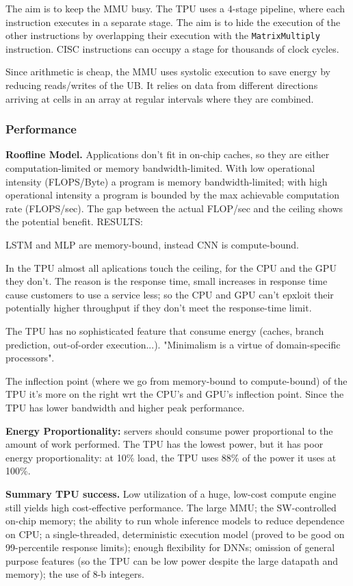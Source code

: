 The aim is to keep the MMU busy. The TPU uses a 4-stage pipeline, where each instruction executes in a separate stage. The aim is to hide the execution of the other instructions by overlapping their execution with the \verb|MatrixMultiply| instruction. CISC instructions can occupy a stage for thousands of clock cycles.

Since arithmetic is cheap, the MMU uses systolic execution to save energy by reducing reads/writes of the UB. It relies on data from different directions arriving at cells in an array at regular intervals where they are combined.

\subsubsection{Performance}
\textbf{Roofline Model.} Applications don't fit in on-chip caches, so they are either computation-limited or memory bandwidth-limited. With low operational intensity (FLOPS/Byte) a program is memory bandwidth-limited; with high operational intensity a program is bounded by the max achievable computation rate (FLOPS/sec). The gap between the actual FLOP/sec and the ceiling shows the potential benefit.
RESULTS:
\begin{dashlist}
    \item LSTM and MLP are memory-bound, instead CNN is compute-bound.
    \item In the TPU almost all aplications touch the ceiling, for the CPU and the GPU they don't. The reason is the response time, small increases in response time cause customers to use a service less; so the CPU and GPU can't epxloit their potentially higher throughput if they don't meet the response-time limit.
    \item The TPU has no sophisticated feature that consume energy (caches, branch prediction, out-of-order execution...). "Minimalism is a virtue of domain-specific processors".
    \item The inflection point (where we go from memory-bound to compute-bound) of the TPU it's more on the right wrt the CPU's and GPU's inflection point. Since the TPU has lower bandwidth and higher peak performance. 
\end{dashlist}
\textbf{Energy Proportionality:} servers should consume power proportional to the amount of work performed. The TPU has the lowest power, but it has poor energy proportionality: at 10\% load, the TPU uses 88\% of the power it uses at 100\%. 

\textbf{Summary TPU success.} Low utilization of a huge, low-cost compute engine still yields high cost-effective performance.
The large MMU; the SW-controlled on-chip memory; the ability to run whole inference models to reduce dependence on CPU; a single-threaded, deterministic execution model (proved to be good on 99-percentile response limits); enough flexibility for DNNs; omission of general purpose features (so the TPU can be low power despite the large datapath and memory); the use of 8-b integers.

